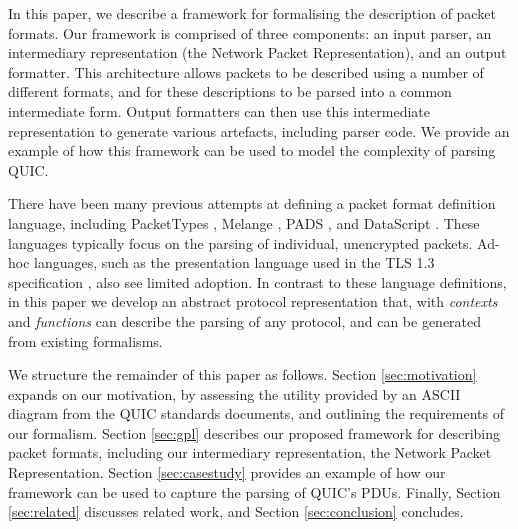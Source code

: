 \documentclass[10pt,sigconf]{acmart}
\begin{document}
In this paper, we describe a framework for formalising the description of packet formats.
Our framework is comprised of three components: an input parser, an intermediary
representation (the Network Packet Representation), and an output formatter. This
architecture allows packets to be described using a number of different formats, and for
these descriptions to be parsed into a common intermediate form. Output formatters can then
use this intermediate representation to generate various artefacts, including parser code.
We provide an example of how this framework can be used to model the complexity of parsing
QUIC.


There have been many previous attempts at defining a packet format definition language,
including PacketTypes \cite{mccann2000packet}, Melange \cite{madhavapeddy2007melange},
PADS \cite{fisher2005pads}, and DataScript \cite{back2002datascript}. These languages
typically focus on the parsing of individual, unencrypted packets. Ad-hoc languages, such
as the presentation language used in the TLS 1.3 specification
\cite{draft-ietf-tls-tls13-28}, also see limited adoption. In contrast to these language
definitions, in this paper we develop an abstract protocol representation that, with
\emph{contexts} and \emph{functions} can describe the parsing of any protocol, and can be
generated from existing formalisms.


We structure the remainder of this paper as follows. Section \ref{sec:motivation} expands
on our motivation, by assessing the utility provided by an ASCII diagram from the QUIC
standards documents, and outlining the requirements of our formalism. Section
\ref{sec:gpl} describes our proposed framework for describing packet formats,
including our intermediary representation, the Network Packet Representation. Section
\ref{sec:casestudy} provides an example of how our framework can be used to capture
the parsing of QUIC's PDUs. Finally, Section \ref{sec:related} discusses
related work, and Section \ref{sec:conclusion} concludes.
\end{document}
